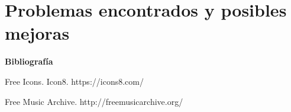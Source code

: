 \section{Problemas encontrados y posibles mejoras}
\label{sec:possible_fixes}



%


\textbf{ Bibliografía}

Free Icons. Icon8. https://icons8.com/

Free Music Archive. http://freemusicarchive.org/
%
%
